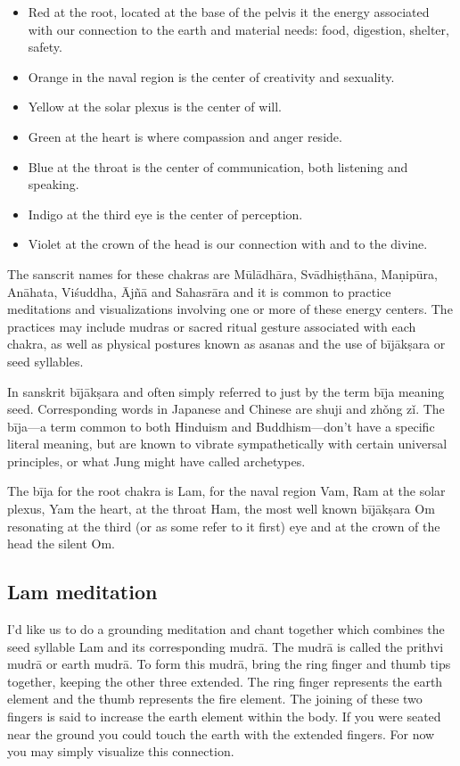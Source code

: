 \documentclass[12pt]{article}
\begin{document}
\begin{itemize}
  \item Red at the root, located at the base of the pelvis it the energy associated with our connection to the earth and material needs: food, digestion, shelter, safety.
  \item Orange in the naval region is the center of creativity and sexuality.
  \item Yellow at the solar plexus is the center of will.
  \item Green at the heart is where compassion and anger reside.
  \item Blue at the throat is the center of communication, both listening and speaking.
  \item Indigo at the third eye is the center of perception.
  \item Violet at the crown of the head is our connection with and to the divine.
\end{itemize}

The sanscrit names for these chakras are Mūlādhāra, Svādhiṣṭhāna, Maṇipūra, Anāhata, Viśuddha, Ājñā and Sahasrāra and it is common to practice meditations and visualizations involving one or more of these energy centers. The practices may include mudras or sacred ritual gesture associated with each chakra, as well as physical postures known as asanas and the use of bījākṣara or seed syllables.

In sanskrit bījākṣara and often simply referred to just by the term bīja meaning seed. Corresponding words in Japanese and Chinese are shuji and zhǒng zǐ. The bīja—a term common to both Hinduism and Buddhism—don't have a specific literal meaning, but are known to vibrate sympathetically with certain universal principles, or what Jung might have called archetypes.

The bīja for the root chakra is Lam, for the naval region Vam, Ram at the solar plexus, Yam the heart, at the throat Ham, the most well known bījākṣara Om resonating at the third (or as some refer to it first) eye and at the crown of the head the silent Om.

\subsection*{Lam meditation}

I'd like us to do a grounding meditation and chant together which combines the seed syllable Lam and its corresponding mudrā. The mudrā is called the prithvi mudrā or earth mudrā. To form this mudrā, bring the ring finger and thumb tips together, keeping the other three extended. The ring finger represents the earth element and the thumb represents the fire element. The joining of these two fingers is said to increase the earth element within the body. If you were seated near the ground you could touch the earth with the extended fingers. For now you may simply visualize this connection.
\end{document}
